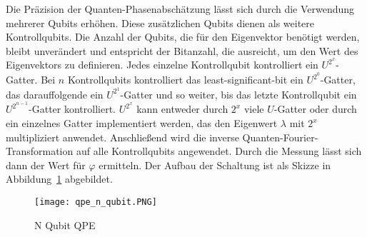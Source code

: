 Die Präzision der Quanten-Phasenabschätzung lässt sich durch die Verwendung mehrerer Qubits erhöhen.
Diese zusätzlichen Qubits dienen als weitere Kontrollqubits.
Die Anzahl der Qubits, die für den Eigenvektor benötigt werden, 
bleibt unverändert und entspricht der Bitanzahl, 
die ausreicht, um den Wert des Eigenvektors zu definieren.
Jedes einzelne Kontrollqubit kontrolliert ein \(U^{2^x}\)-Gatter.
Bei \(n\) Kontrollqubits kontrolliert das least-significant-bit ein \(U^{2^0}\)-Gatter,
das darauffolgende ein \(U^{2^1}\)-Gatter und so weiter,
bis das letzte Kontrollqubit ein \(U^{2^{n-1}}\)-Gatter kontrolliert.
\(U^{2^x}\) kann entweder durch \(2^x\) viele \(U\)-Gatter oder durch ein einzelnes Gatter implementiert werden, 
das den Eigenwert \(\lambda\) mit \(2^x\) multipliziert anwendet.
Anschließend wird die inverse Quanten-Fourier-Transformation auf alle Kontrollqubits angewendet.
Durch die Messung lässt sich dann der Wert für \(\varphi\) ermitteln.
Der Aufbau der Schaltung ist als Skizze in Abbildung~\ref{fig:qpe_n_qubit} abgebildet.

\begin{figure}[H]
  \centering
  \texttt{[image: qpe\_n\_qubit.PNG]}
  \caption{N Qubit QPE}
  \label{fig:qpe_n_qubit}
\end{figure}

